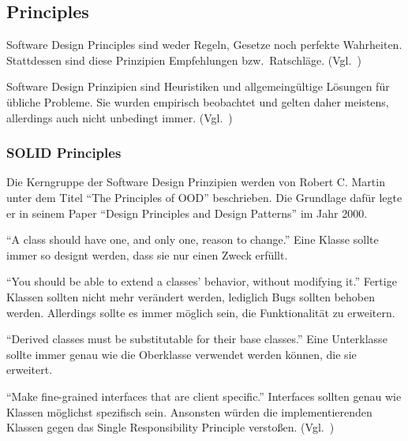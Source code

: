 \subsection{Principles}
Software Design Principles sind weder Regeln, Gesetze noch perfekte Wahrheiten.
Stattdessen sind diese Prinzipien Empfehlungen bzw.\ Ratschläge.
(Vgl.~\cite{getting-a-solid-start})

Software Design Prinzipien sind Heuristiken und allgemeingültige Lösungen für übliche Probleme.
Sie wurden empirisch beobachtet und gelten daher meistens, allerdings auch nicht unbedingt immer.
(Vgl.~\cite{getting-a-solid-start})

\subsubsection{SOLID Principles}
Die Kerngruppe der Software Design Prinzipien werden von Robert C. Martin unter dem Titel \enquote{The Principles of OOD}\cite{solid} beschrieben.
Die Grundlage dafür legte er in seinem Paper \enquote{Design Principles and Design Patterns}\cite{design-principles-and-design-patterns} im Jahr 2000.

\enquote{A class should have one, and only one, reason to change.}\cite{solid}
Eine Klasse sollte immer so designt werden, dass sie nur einen Zweck erfüllt\cite{different-types-of-software-design-principles}.

\enquote{You should be able to extend a classes' behavior, without modifying it.}\cite{solid}
Fertige Klassen sollten nicht mehr verändert werden, lediglich Bugs sollten behoben werden\cite{different-types-of-software-design-principles}.
Allerdings sollte es immer möglich sein, die Funktionalität zu erweitern\cite{different-types-of-software-design-principles}.

\enquote{Derived classes must be substitutable for their base classes.}\cite{solid}
Eine Unterklasse sollte immer genau wie die Oberklasse verwendet werden können, die sie erweitert\cite{different-types-of-software-design-principles}.

\enquote{Make fine-grained interfaces that are client specific.}\cite{solid}
Interfaces sollten genau wie Klassen möglichst spezifisch sein.
Ansonsten würden die implementierenden Klassen gegen das Single Responsibility Principle verstoßen.
(Vgl.~\cite{design-patterns-php-laravel})

